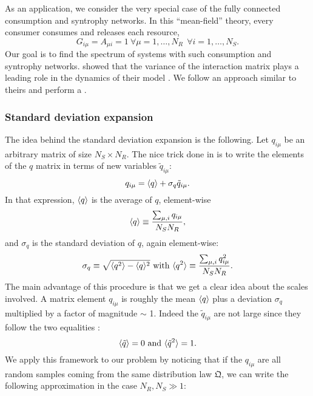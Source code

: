 \documentclass[12pt, titlepage, twoside, openright]{report}
\begin{document}
As an application, we consider the very special case of the fully connected consumption and syntrophy networks. In this ``mean-field'' theory, every consumer consumes and releases each resource, \ie
\begin{equation}
G_{i\mu}=A_{\mu i}=1 \ \forall \mu=1, \dots, N_R \ \ \forall i=1, \dots, N_S.
\end{equation}
Our goal is to find the spectrum of systems with such consumption and syntrophy networks.
\citeauthor{barbier_cavity_2017} showed that the variance of the interaction matrix plays a leading role in the dynamics of their model \cite{barbier_cavity_2017}. We follow an approach similar to theirs and perform a .

\subsubsection{Standard deviation expansion}\label{sec : standard deviation expansion}
The idea behind the standard deviation expansion is the following. Let $q_{i\mu}$ be an arbitrary matrix of size $N_S \times N_R$. The nice trick done in \cite{barbier_cavity_2017} is to write the elements of the $q$ matrix in terms of new variables $\tilde{q}_{i\mu}$:
\begin{equation}
q_{i\mu} = \langle q \rangle + \sigma_q \tilde{q}_{i\mu}. \label{eq : separation matrix average standard dev}
\end{equation}
In that expression, $\langle q \rangle$ is the average of $q$, element-wise
\begin{equation}
\langle q \rangle\equiv \frac{\sum_{\mu,i} q_{i\mu}}{N_S N_R},
\end{equation}
and $\sigma_q$ is the standard deviation of $q$, again element-wise:
\begin{equation}
\sigma_q \equiv \sqrt{\langle q^2 \rangle-\langle q \rangle^2} \text{ with } \langle q^2 \rangle\equiv \frac{\sum_{\mu,i} q_{i\mu}^2}{N_S N_R}.
\end{equation}
The main advantage of this procedure is that we get a clear idea about the scales involved. A matrix element $q_{i\mu}$ is roughly the mean $\langle q \rangle$ plus a deviation $\sigma_q$ multiplied by a factor of magnitude $\sim$ 1. Indeed the $\tilde{q}_{i\mu}$ are not large since they follow the two equalities \cite{barbier_cavity_2017}:
\begin{equation}
\langle \tilde{q} \rangle = 0 \text{ and } \langle \tilde{q}^2 \rangle = 1.
\end{equation}
We apply this framework to our problem by noticing that if the $q_{i\mu}$ are all random samples coming from the same distribution law $\mathfrak{Q}$, we can write the following approximation in the case $N_R, N_S \gg 1 $:
\end{document}
